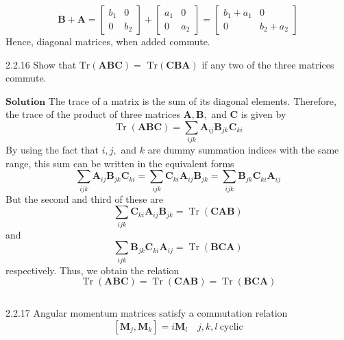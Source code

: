 $$\mathbf{B}+\mathbf{A}=\left[\begin{array}{ll}{b_{1}} & {0} \\ {0} & {b_{2}}\end{array}\right]+\left[\begin{array}{ll}{a_{1}} & {0} \\ {0} & {a_{2}}\end{array}\right]=\left[\begin{array}{cc}{b_{1}+a_{1}} & {0} \\ {0} & {b_{2}+a_{2}}\end{array}\right]$$
Hence, diagonal matrices, when added commute.

\newpage


\begin{mybox}{2.2.16}
Show that $\text{Tr}(\mathbf{ABC})=$ $\text{Tr}(\mathbf{CBA})$ if any two of the three matrices commute.
\end{mybox}



$\boxed{\textbf{Solution}}$  The trace of a matrix is the sum of its diagonal elements. Therefore, the trace of the product of three matrices $\mathbf{A}, \mathbf{B},$ and $\mathbf{C}$ is
given by
$$
\operatorname{Tr}(\mathbf{A} \mathbf{B} \mathbf{C})=\sum_{i j k} \mathbf{A}_{i j} \mathbf{B}_{j k} \mathbf{C}_{k i}
$$
By using the fact that $i, j,$ and $k$ are dummy summation indices
with the same range, this sum can be written in the equivalent
forms
$$
\sum_{i j k} \mathbf{A}_{i j} \mathbf{B}_{j k} \mathbf{C}_{k i}=\sum_{i j k} \mathbf{C}_{k i} \mathbf{A}_{i j} \mathbf{B}_{j k}=\sum_{i j k} \mathbf{B}_{j k} \mathbf{C}_{k i} \mathbf{A}_{i j}
$$
But the second and third of these are
$$
\sum_{i j k} \mathbf{C}_{k i} \mathbf{A}_{i j} \mathbf{B}_{j k}=\operatorname{Tr}(\mathbf{C} \mathbf{A} \mathbf{B})
$$
and
$$
\sum_{i j k} \mathbf{B}_{j k} \mathbf{C}_{k i} \mathbf{A}_{i j}=\operatorname{Tr}(\mathbf{B} \mathbf{C} \mathbf{A})
$$
respectively. Thus, we obtain the relation
$$
\operatorname{Tr}(\mathbf{A} \mathbf{B} \mathbf{C})=\operatorname{Tr}(\mathbf{C} \mathbf{A} \mathbf{B})=\operatorname{Tr}(\mathbf{B} \mathbf{C} \mathbf{A})
$$

$$$$

\begin{mybox}{2.2.17}
Angular momentum matrices satisfy a commutation relation
$$[\mathbf{M}_j,\mathbf{M}_k]=i\mathbf{M}_l \quad j,k,l \ \text{cyclic}$$
\end{mybox}



